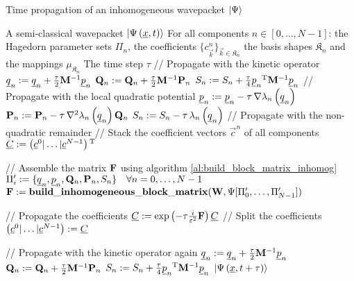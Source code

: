 \begin{algorithm}
\caption{Time propagation of an inhomogeneous wavepacket $\Ket{\Psi}$}
\label{al:tp_wave_packets_inhomog}
\begin{algorithmic}
  \REQUIRE A semi-classical wavepacket $\Ket{\Psi\left( \underline{x},t \right)}$
  \REQUIRE For all components $n \in [0, \ldots, N-1]$:
  \REQUIRE the Hagedorn parameter sets $\Pi_n$, the coefficients $\{c^n_{\vec{k}}\}_{\vec{k}\in\mathfrak{K}_n}$
  \REQUIRE the basis shapes $\mathfrak{K}_n$ and the mappings $\mu_{\mathfrak{K}_n}$
  \REQUIRE The time step $\tau$
  \STATE // Propagate with the kinetic operator
    \STATE $\underline{q}_n := \underline{q}_n + \frac{\tau}{2} \mathbf{M}{}^{-1} \underline{p}_n$
    \STATE $\mathbf{Q}_n := \mathbf{Q}_n + \frac{\tau}{2} \mathbf{M}{}^{-1} \mathbf{P}_n$
    \STATE $S_n := S_n + \frac{\tau}{4} \underline{p}_n{}^{\textnormal{T}} \mathbf{M}{}^{-1} \underline{p}_n$
  \ENDFOR
  \STATE // Propagate with the local quadratic potential
    \STATE $\underline{p}_n := \underline{p}_n - \tau \, \nabla \lambda_n\left( \underline{q}_n \right)$
    \STATE $\mathbf{P}_n := \mathbf{P}_n - \tau \, \nabla^2 \lambda_n\left( \underline{q}_n \right) \mathbf{Q}_n$
    \STATE $S_n := S_n - \tau \, \lambda_n\left( \underline{q}_n \right)$
  \ENDFOR
  \STATE // Propagate with the non-quadratic remainder
  \STATE // Stack the coefficient vectors $\vec{c}^n$ of all components
  \STATE $\underline{C} := \left(\underline{c}^0 | \hdots | \underline{c}^{N-1}\right){}^{\textnormal{T}}$

  \STATE // Assemble the matrix $\mathbf{F}$ using algorithm \ref{al:build_block_matrix_inhomog}
  \STATE $\Pi_i^\prime := \{\underline{q}_n, \underline{p}_n, \mathbf{Q}_n, \mathbf{P}_n, S_n\} \quad \forall n = 0, \ldots ,N-1$
  \STATE $\mathbf{F} := \mathbf{build\_inhomogeneous\_block\_matrix}(\mathbf{W}, \Psi[\Pi^\prime_0, \ldots ,\Pi^\prime_{N-1}])$

  \STATE // Propagate the coefficients
  \STATE $\underline{C} := \exp\left( -\tau \frac{i}{\varepsilon^2} \mathbf{F} \right) \underline{C}$
  \STATE // Split the coefficients
  \STATE $\left(\underline{c}^0 | \ldots | \underline{c}^{N-1}\right) := \underline{C}$

  \STATE // Propagate with the kinetic operator again
    \STATE $\underline{q}_n := \underline{q}_n + \frac{\tau}{2} \mathbf{M}{}^{-1} \underline{p}_n$
    \STATE $\mathbf{Q}_n := \mathbf{Q}_n + \frac{\tau}{2} \mathbf{M}{}^{-1} \mathbf{P}_n$
    \STATE $S_n := S_n + \frac{\tau}{4} \underline{p}_n{}^{\textnormal{T}} \mathbf{M}{}^{-1} \underline{p}_n$
  \ENDFOR
  \RETURN $\Ket{\Psi\left( \underline{x}, t+\tau \right)}$
\end{algorithmic}
\end{algorithm}
